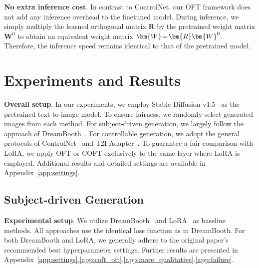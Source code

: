 \textbf{No extra inference cost}. In contrast to ControlNet, our OFT framework does not add any inference overhead to the finetuned model. During inference, we simply multiply the learned orthogonal matrix $\bm{R}$ by the pretrained weight matrix $\bm{W}^0$ to obtain an equivalent weight matrix $\thickmuskip=2mu \medmuskip=2mu \bm{W}=\bm{R}\bm{W}^0$. Therefore, the inference speed remains identical to that of the pretrained model.

\section{Experiments and Results}

\textbf{Overall setup}. In our experiments, we employ Stable Diffusion v1.5~\cite{rombach2022high} as the pretrained text-to-image model. To ensure fairness, we randomly select generated images from each method. For subject-driven generation, we largely follow the approach of DreamBooth~\cite{ruiz2023dreambooth}. For controllable generation, we adopt the general protocols of ControlNet~\cite{zhang2023adding} and T2I-Adapter~\cite{mou2023t2i}. To guarantee a fair comparison with LoRA, we apply OFT or COFT exclusively to the same layer where LoRA is employed. Additional results and detailed settings are available in Appendix~\ref{app:settings}.

\subsection{Subject-driven Generation}

\textbf{Experimental setup}. We utilize DreamBooth~\cite{ruiz2023dreambooth} and LoRA~\cite{hulora2022} as baseline methods. All approaches use the identical loss function as in DreamBooth. For both DreamBooth and LoRA, we generally adhere to the original paper’s recommended best hyperparameter settings. Further results are presented in Appendix~\ref{app:settings},\ref{app:coft_oft},\ref{app:more_qualitative},\ref{app:failure}.

